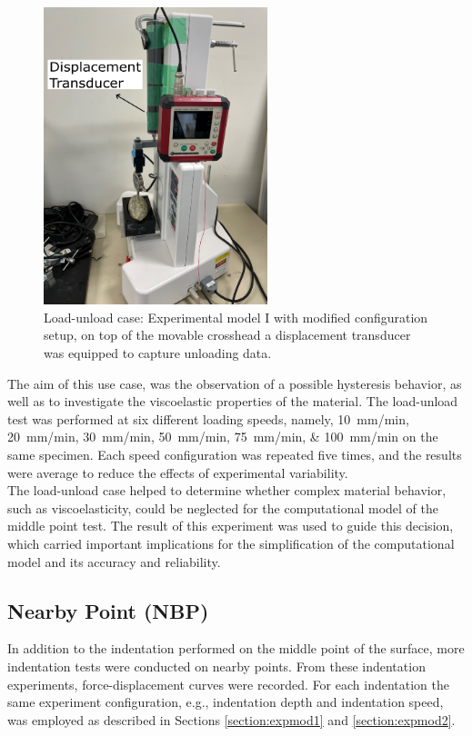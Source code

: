 \begin{figure}%
    \centering
   \quad
   \includegraphics[width=6.5cm]{Images/Experiment/unloading.png}%
   \caption[Load-unloading test]{Load-unload case: Experimental model I with modified configuration setup, on top of the movable crosshead a displacement transducer was equipped to capture unloading data.}%
   \label{fig:unloadingexp1}%
\end{figure}
 
The aim of this use case, was the observation of a possible hysteresis
behavior, as well as to investigate the viscoelastic properties of the material.
The load-unload test was performed at six different loading speeds, namely, 
\SIlist[per-mode = symbol]{10;20;30;50;75;100}{\milli \metre \per \minute} on the 
same specimen.
Each speed configuration was repeated five times, and the results were average to 
reduce the effects of experimental variability.\\

The load-unload case helped to determine whether complex material behavior, such as 
viscoelasticity, could be neglected for the computational model of the middle point test.
The result of this experiment was used to guide this decision, which carried important 
implications for the simplification of the computational model and its accuracy and reliability.

\subsection*{Nearby Point (NBP)}
\label{subsection:nearbypoint}
In addition to the indentation performed on the middle point of the surface, more 
indentation tests were conducted on nearby points. From these indentation experiments, force-displacement 
curves were recorded. For each indentation the same experiment configuration, 
e.g., indentation depth and indentation 
speed, was employed as described in Sections \ref{section:expmod1} and \ref{section:expmod2}.

